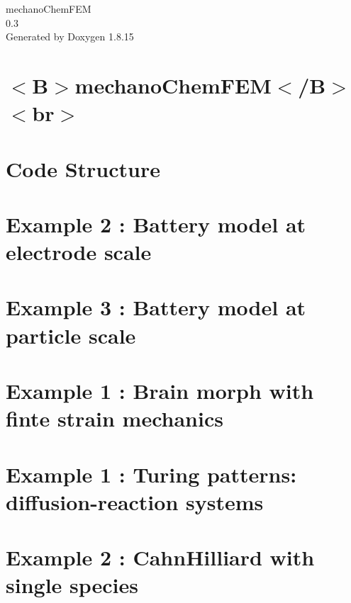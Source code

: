 \let\mypdfximage\pdfximage\def\pdfximage{\immediate\mypdfximage}\documentclass[twoside]{book}
\newcommand{\+}{\discretionary{\mbox{\scriptsize$\hookleftarrow$}}{}{}}
\newcommand{\clearemptydoublepage}{%
  \newpage{\pagestyle{empty}\cleardoublepage}%
}
\begin{document}
\begin{titlepage}
\vspace*{7cm}
\begin{center}%
{\Large mechano\+Chem\+F\+EM \\[1ex]\large 0.\+3 }\\
\vspace*{1cm}
{\large Generated by Doxygen 1.8.15}\\
\end{center}
\end{titlepage}
\clearemptydoublepage
{}
\tableofcontents
\clearemptydoublepage
{}

\chapter{$<$B$>$mechano\+Chem\+F\+EM$<$/B$>$$<$br$>$}
\label{md_mechano_chem_f_e_m_readme}

\chapter{Code Structure}
\label{codestructure}

\chapter{Example 2 \+: Battery model at electrode scale}
\label{battery_electrode_scale}

\chapter{Example 3 \+: Battery model at particle scale}
\label{battery_particle}

\chapter{Example 1 \+: Brain morph with finte strain mechanics}
\label{brain_morph}

\chapter{Example 1 \+: Turing patterns\+: diffusion-\/reaction systems}
\label{diffusion_reaction}

\chapter{Example 2 \+: Cahn\+Hilliard with single species}
\label{_cahn_hilliard}

\end{document}
